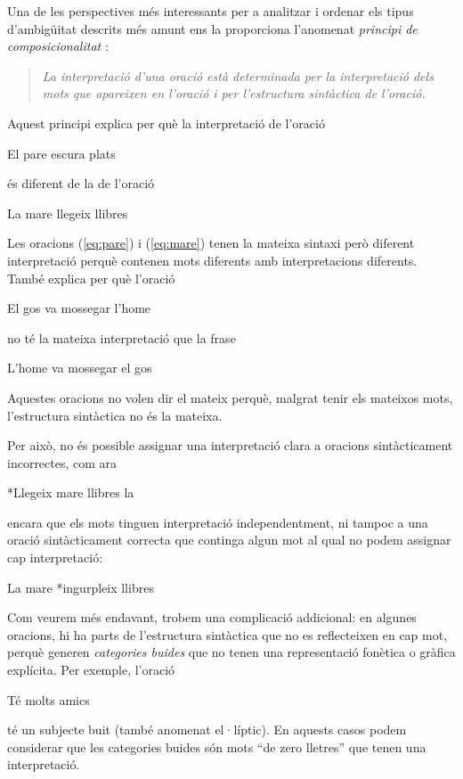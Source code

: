 Una de les perspectives més interessants per a analitzar i ordenar els
tipus d'ambigüitat descrits més amunt ens la proporciona l'anomenat
\emph{principi de composicionalitat}  \citep[cap.~23]{radford09b}:
\begin{quote}
{\sl
La interpretació d'una oració està determinada per la interpretació
dels mots que apareixen en l'oració i per l'estructura sin\-tàc\-tica de
l'oració.
}
\end{quote}
Aquest principi explica per què la interpretació de l'oració
\begin{exemple}
\label{eq:pare}
El pare escura plats
\end{exemple}
 és diferent de la de l'oració
\begin{exemple} 
La mare llegeix
  llibres
\label{eq:mare}
\end{exemple}
Les oracions (\ref{eq:pare}) i (\ref{eq:mare}) tenen la mateixa sintaxi però diferent
interpretació perquè contenen mots diferents amb interpretacions
diferents. També explica per què l'oració 
\begin{exemple}
El gos va mossegar
  l'home
\end{exemple}
 no té la mateixa interpretació que la frase 
\begin{exemple}
L'home va
  mossegar el gos
\end{exemple} 
Aquestes oracions no volen dir el mateix perquè, malgrat tenir els
mateixos mots, l'estructura sintàctica no és la mateixa.


Per això, no és possible assignar una interpretació clara a oracions
sin\-tàc\-ti\-ca\-ment incorrectes, com ara
\begin{exemple}
*Llegeix mare llibres la
\end{exemple} 
encara que els mots tinguen interpretació independentment, ni
tampoc a una oració sintàcticament correcta que continga algun mot al
qual no podem assignar cap interpretació:
\begin{exemple}
 La mare *ingurpleix llibres
\end{exemple}
Com veurem més endavant, trobem una complicació addicional: en algunes
oracions, hi ha parts de l'estructura sintàctica que no
es reflecteixen en cap mot, perquè generen \emph{categories buides} que
no tenen una representació fonètica o gràfica explícita.  Per exemple,
l'oració 
\begin{exemple}
Té molts amics
\end{exemple} té un subjecte buit (també anomenat
el·líptic). En aquests casos podem considerar que les categories
buides són mots ``de zero lletres'' que tenen una interpretació.

